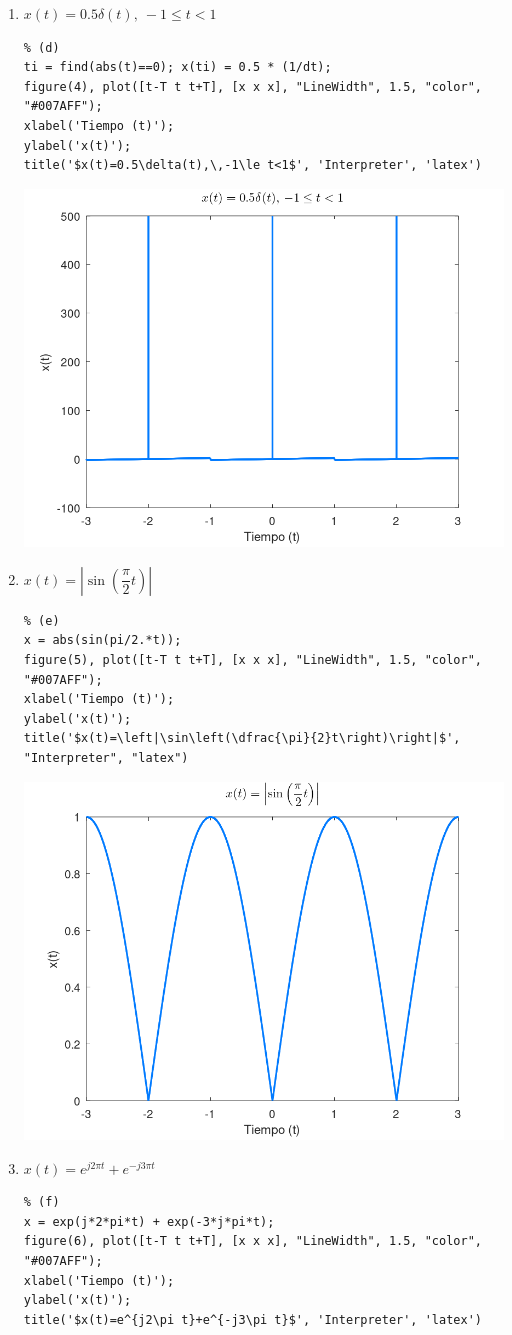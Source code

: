 \documentclass{article}
\begin{document}
\begin{enumerate}[leftmargin=*]
\begin{enumerate}[label=\alph*)]
\begin{center}
\end{center}
\item $x(t)=0.5\delta(t),\:-1\le t<1$
\begin{lstlisting}
% (d)
ti = find(abs(t)==0); x(ti) = 0.5 * (1/dt);
figure(4), plot([t-T t t+T], [x x x], "LineWidth", 1.5, "color", "#007AFF");
xlabel('Tiempo (t)');
ylabel('x(t)');
title('$x(t)=0.5\delta(t),\,-1\le t<1$', 'Interpreter', 'latex')
\end{lstlisting}
\begin{center}
\includegraphics[width=0.5\linewidth]{Imágenes/Figura4}
\end{center}
\item $x(t)=\left|\sin\left(\dfrac{\pi}{2}t\right)\right|$
\begin{lstlisting}
% (e)
x = abs(sin(pi/2.*t));
figure(5), plot([t-T t t+T], [x x x], "LineWidth", 1.5, "color", "#007AFF");
xlabel('Tiempo (t)');
ylabel('x(t)');
title('$x(t)=\left|\sin\left(\dfrac{\pi}{2}t\right)\right|$', "Interpreter", "latex")
\end{lstlisting}
\begin{center}
\includegraphics[width=0.5\linewidth]{Imágenes/Figura5}
\end{center}
\item $x(t)=e^{j2\pi t}+e^{-j3\pi t}$
\begin{lstlisting}
% (f)
x = exp(j*2*pi*t) + exp(-3*j*pi*t);
figure(6), plot([t-T t t+T], [x x x], "LineWidth", 1.5, "color", "#007AFF");
xlabel('Tiempo (t)');
ylabel('x(t)');
title('$x(t)=e^{j2\pi t}+e^{-j3\pi t}$', 'Interpreter', 'latex')

\end{lstlisting}
\end{enumerate}
\end{enumerate}
\end{document}
